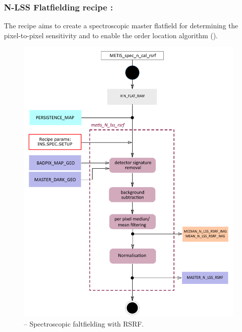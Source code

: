 \subsubsection{N-LSS Flatfielding recipe :}\label{rec:lssnrsrf}
The recipe  aims to create a spectroscopic master flatfield for determining the pixel-to-pixel sensitivity and to enable the order location algorithm ().
\begin{figure}[ht]
  \centering
  \includegraphics[width=0.5\textheight]{figures/metis_n_lss_rsrf_v0.72.pdf}
  \caption[Recipe: ]{ --
    Spectroscopic faltfielding with \ac{RSRF}.}
  \label{Fig:rec_n_lss_rsrf}
\end{figure}

